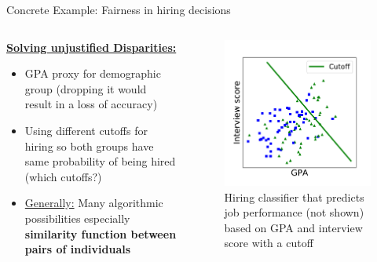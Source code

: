 \begin{frame}{Concrete Example: Fairness in hiring decisions \cite{barocas-hardt-narayanan}}
    \begin{columns}
\begin{column}{0.5\textwidth}
\underline{\textbf{Solving unjustified Disparities:}}\newline 

   \begin{itemize}
       \item GPA proxy for demographic group (dropping it would result in a loss of accuracy)
       \item Using different cutoffs for hiring so both groups have same probability of being hired (which cutoffs?)
       \item \underline{Generally:} Many algorithmic possibilities especially \textbf{similarity function between pairs of individuals}
   \end{itemize}
\end{column}
\begin{column}{0.5\textwidth}  %
    \begin{figure}
        \centering
        \includegraphics[width=.70\textwidth]{presentation/assets/toy_example.pdf}
        \caption{Hiring classifier that predicts job performance (not shown) based on GPA and interview score with a cutoff \cite{barocas-hardt-narayanan}}
        \label{fig:my_label}
    \end{figure}
\end{column}
\end{columns}
\end{frame}